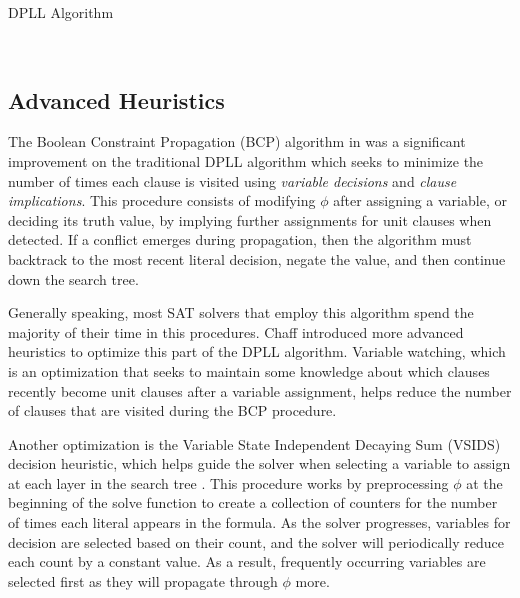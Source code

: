 \documentclass[paper=a4, fontsize=11pt]{scrartcl} %
\begin{document}
\begin{algorithm}[t] %
\caption{DPLL Algorithm \cite{DPLL}} \label{alg:DPLL}
\begin{algorithmic}[1]
\Require{$\phi$}
\EndIf
{}
\EndIf
{}
\EndFor
{}
\EndFor
{}\\
\end{algorithmic}
\end{algorithm}
 
\subsection{Advanced Heuristics}
The Boolean Constraint Propagation (BCP) algorithm in \cite{chaff} was a significant improvement
on the traditional DPLL algorithm which seeks to minimize the number of times
each clause is visited using \emph{variable decisions} and \emph{clause implications}. 
This procedure consists of modifying $\phi$ after assigning a variable,
or deciding its truth value, by implying further assignments for unit clauses when
detected. If a conflict emerges during propagation, then the algorithm must backtrack 
to the most recent literal decision, negate the value, and then continue down the search tree.

Generally speaking, most SAT solvers that employ this algorithm spend the majority of their time in this procedures. 
Chaff \cite{chaff} introduced more advanced heuristics to optimize this part of the 
DPLL algorithm. Variable watching, which is an optimization that seeks to maintain some 
knowledge about which clauses recently become unit clauses after a variable assignment, helps
reduce the number of clauses that are visited during the BCP procedure. 

Another optimization is the Variable State Independent Decaying Sum (VSIDS) decision heuristic, which helps guide
the solver when selecting a variable to assign at each layer in the search tree \cite{chaff}.
This procedure works by preprocessing $\phi$ at the beginning of the solve function
to create a collection of counters for the number of times each literal appears
in the formula. As the solver progresses, variables for decision are selected based on
their count, and the solver will periodically reduce each count by a constant value.
As a result, frequently occurring variables are selected first as they will propagate 
through $\phi$ more. 
\end{document}

